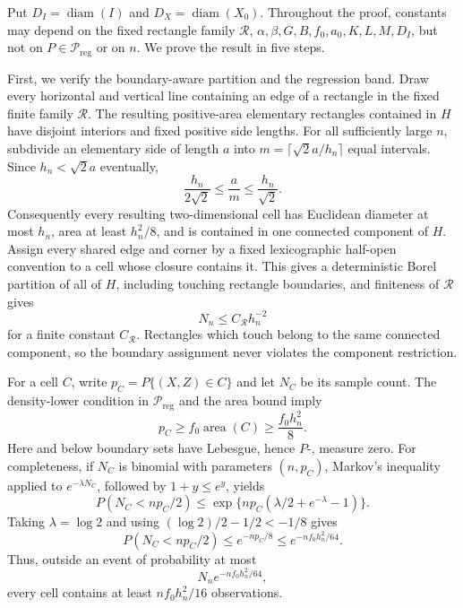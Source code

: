 Put \(D_I=\operatorname{diam}(I)\) and \(D_X=\operatorname{diam}(X_0)\).  Throughout the proof, constants may depend on the fixed rectangle family \(\mathscr R\), \(\alpha,\beta,G,B,f_0,a_0,K,L,M,D_I\), but not on \(P\in\mathcal P_{\mathrm{reg}}\) or on \(n\).  We prove the result in five steps.

First, we verify the boundary-aware partition and the regression band.  Draw every horizontal and vertical line containing an edge of a rectangle in the fixed finite family \(\mathscr R\).  The resulting positive-area elementary rectangles contained in \(H\) have disjoint interiors and fixed positive side lengths.  For all sufficiently large \(n\), subdivide an elementary side of length \(a\) into \(m=\lceil \sqrt{2}a/h_n\rceil\) equal intervals.  Since \(h_n<\sqrt{2}a\) eventually,
\[
 \frac{h_n}{2\sqrt{2}}\le \frac{a}{m}\le \frac{h_n}{\sqrt{2}}.
\]
Consequently every resulting two-dimensional cell has Euclidean diameter at most \(h_n\), area at least \(h_n^2/8\), and is contained in one connected component of \(H\).  Assign every shared edge and corner by a fixed lexicographic half-open convention to a cell whose closure contains it.  This gives a deterministic Borel partition of all of \(H\), including touching rectangle boundaries, and finiteness of \(\mathscr R\) gives
\[
 N_n\le C_{\mathscr R}h_n^{-2}                                                   \tag{1}
\]
for a finite constant \(C_{\mathscr R}\).  Rectangles which touch belong to the same connected component, so the boundary assignment never violates the component restriction.

For a cell \(C\), write \(p_C=P\{(X,Z)\in C\}\) and let \(N_C\) be its sample count.  The density-lower condition in \(\mathcal P_{\mathrm{reg}}\) and the area bound imply
\[
 p_C\ge f_0\operatorname{area}(C)\ge \frac{f_0h_n^2}{8}.                         \tag{2}
\]
Here and below boundary sets have Lebesgue, hence \(P\)-, measure zero.  For completeness, if \(N_C\) is binomial with parameters \((n,p_C)\), Markov's inequality applied to \(e^{-\lambda N_C}\), followed by \(1+y\le e^y\), yields
\[
 P(N_C<np_C/2)
 \le \exp\{np_C(\lambda/2+e^{-\lambda}-1)\}.
\]
Taking \(\lambda=\log 2\) and using \((\log 2)/2-1/2<-1/8\) gives
\[
 P(N_C<np_C/2)\le e^{-np_C/8}\le e^{-nf_0h_n^2/64}.                              \tag{3}
\]
Thus, outside an event of probability at most
\[
 N_ne^{-nf_0h_n^2/64},                                                            \tag{4}
\]
every cell contains at least \(nf_0h_n^2/16\) observations.

